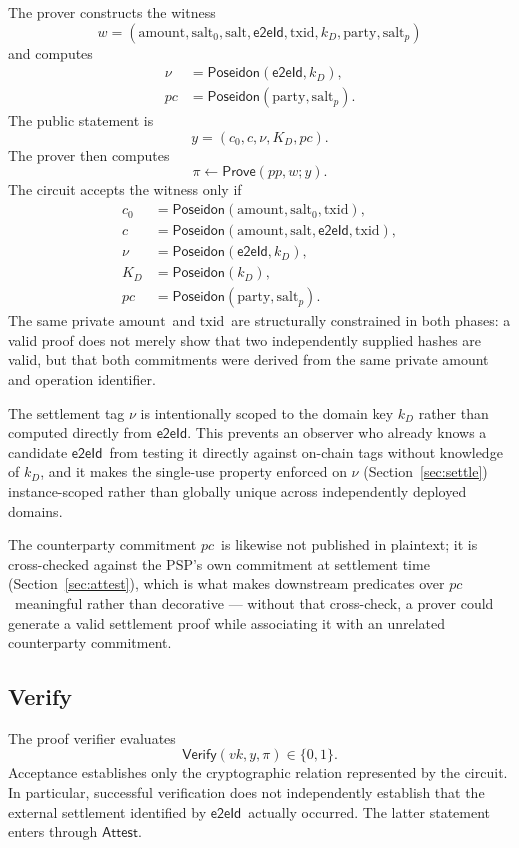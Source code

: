 \documentclass[10pt,twocolumn]{article}
\newcommand{\Poseidon}{\ensuremath{\mathsf{Poseidon}}}
\newcommand{\eeid}{\ensuremath{\mathsf{e2eId}}}
\newcommand{\amount}{\ensuremath{\text{amount}}}
\newcommand{\txid}{\ensuremath{\text{txid}}}
\newcommand{\party}{\ensuremath{\text{party}}}
\newcommand{\salt}{\ensuremath{\text{salt}}}
\newcommand{\pc}{\ensuremath{\mathit{pc}}}
\newcommand{\Prove}{\ensuremath{\mathsf{Prove}}}
\newcommand{\Verify}{\ensuremath{\mathsf{Verify}}}
\newcommand{\Attest}{\ensuremath{\mathsf{Attest}}}
\begin{document}
The prover constructs the witness
\[
w = (\amount,\salt_0,\salt,\eeid,\txid,k_D,\party,\salt_p)
\]
and computes
\[
\begin{aligned}
\nu &= \Poseidon(\eeid,k_D), \\
\pc &= \Poseidon(\party,\salt_p).
\end{aligned}
\]
The public statement is
\[
y = (c_0,c,\nu,K_D,\pc).
\]
The prover then computes
\[
\pi \leftarrow \Prove(pp,w;y).
\]
The circuit accepts the witness only if
\begin{align}
c_0 &= \Poseidon(\amount,\salt_0,\txid), \label{eq:c0}\\
c &= \Poseidon(\amount,\salt,\eeid,\txid), \label{eq:c}\\
\nu &= \Poseidon(\eeid,k_D), \label{eq:nu}\\
K_D &= \Poseidon(k_D), \label{eq:KD}\\
\pc &= \Poseidon(\party,\salt_p). \label{eq:pc}
\end{align}
The same private \amount\ and \txid\ are structurally constrained in both
phases: a valid proof does not merely show that two independently
supplied hashes are valid, but that both commitments were derived from
the same private amount and operation identifier.

The settlement tag $\nu$ is intentionally scoped to the domain key $k_D$
rather than computed directly from \eeid. This prevents an observer who
already knows a candidate \eeid\ from testing it directly against
on-chain tags without knowledge of $k_D$, and it makes the single-use
property enforced on $\nu$ (Section~\ref{sec:settle}) instance-scoped
rather than globally unique across independently deployed domains.

The counterparty commitment \pc\ is likewise not published in plaintext;
it is cross-checked against the PSP's own commitment at settlement time
(Section~\ref{sec:attest}), which is what makes downstream predicates
over \pc\ meaningful rather than decorative --- without that cross-check,
a prover could generate a valid settlement proof while associating it
with an unrelated counterparty commitment.

\subsection{Verify}

The proof verifier evaluates
\[
\Verify(vk,y,\pi) \in \{0,1\}.
\]
Acceptance establishes only the cryptographic relation represented by the
circuit. In particular, successful verification does not independently
establish that the external settlement identified by \eeid\ actually
occurred. The latter statement enters through \Attest.
\end{document}
